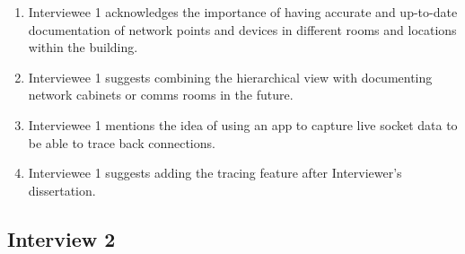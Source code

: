 \begin{enumerate}
    \item Interviewee 1 acknowledges the importance of having accurate and up-to-date documentation of network points and devices in different rooms and locations within the building.
    \item Interviewee 1 suggests combining the hierarchical view with documenting network cabinets or comms rooms in the future.
    \item Interviewee 1 mentions the idea of using an app to capture live socket data to be able to trace back connections.
    \item Interviewee 1 suggests adding the tracing feature after Interviewer’s dissertation.
\end{enumerate}

\subsection{Interview 2}
\label {sec:thematicAnalysisInterview2}
